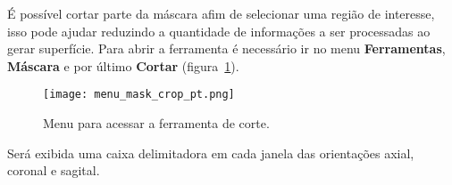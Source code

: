 É possível cortar parte da máscara afim de selecionar uma região de interesse, isso pode ajudar reduzindo a quantidade de informações a ser processadas ao gerar superfície. Para abrir a ferramenta é necessário ir no menu \textbf{Ferramentas}, \textbf{Máscara} e por último \textbf{Cortar} (figura~\ref{fig:menu_mask_crop}).

\begin{figure}[!htb]
\centering
\texttt{[image: menu\_mask\_crop\_pt.png]}
\caption{Menu para acessar a ferramenta de corte.}
\label{fig:menu_mask_crop}
\end{figure}

Será exibida uma caixa delimitadora em cada janela das orientações axial, coronal e sagital.